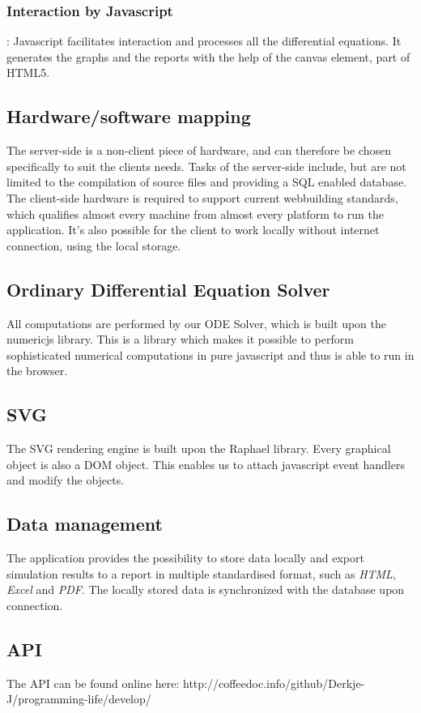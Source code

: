 \documentclass{report}
\begin{document}
				\subsubsection{Interaction by Javascript}
					: Javascript facilitates interaction and processes all the differential equations. It generates the graphs and the reports with the help of the canvas element, part of HTML5.

		\subsection{Hardware/software mapping}
			The server-side is a non-client piece of hardware, and can therefore be chosen specifically to suit the clients needs. Tasks of the server-side include, but are not limited to the compilation of source files and providing a SQL enabled database. The client-side hardware is required to support current webbuilding standards, which qualifies almost every machine from almost every platform to run the application. It's also possible for the client to work locally without internet connection, using the local storage.\\
\clearpage
		\subsection{Ordinary Differential Equation Solver}
			All computations are performed by our ODE Solver, which is built upon the numericjs library. This is a library which makes it possible to perform sophisticated numerical computations in pure javascript and thus is able to run in the browser.
		\subsection{SVG}
			The SVG rendering engine is built upon the Raphael library. Every graphical object is also a DOM object. This enables us to attach javascript event handlers and modify the objects.
		\subsection{Data management}
			The application provides the possibility to store data locally and export simulation results to a report in multiple standardised format, such as \emph{HTML}, \emph{Excel} and \emph{PDF}.
			The locally stored data is synchronized with the database upon connection. 	
		\subsection{API}
			The API can be found online here: http://coffeedoc.info/github/Derkje-J/programming-life/develop/
	
\end{document}
